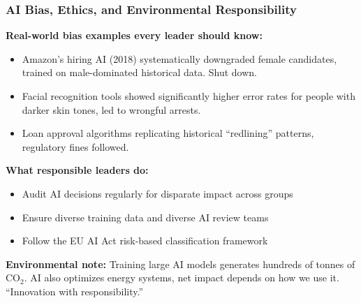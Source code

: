 \begin{frame}[fragile]\frametitle{AI Bias, Ethics, and Environmental Responsibility}

\textbf{Real-world bias examples every leader should know:}
\begin{itemize}
  \item Amazon's hiring AI (2018) systematically downgraded female candidates, trained on male-dominated historical data. Shut down.
  \item Facial recognition tools showed significantly higher error rates for people with darker skin tones, led to wrongful arrests.
  \item Loan approval algorithms replicating historical ``redlining'' patterns, regulatory fines followed.
\end{itemize}

\textbf{What responsible leaders do:}
\begin{itemize}
  \item Audit AI decisions regularly for disparate impact across groups
  \item Ensure diverse training data and diverse AI review teams
  \item Follow the EU AI Act risk-based classification framework
\end{itemize}

\textbf{Environmental note:} Training large AI models generates hundreds of tonnes of CO$_2$. AI also optimizes energy systems, net impact depends on how we use it. ``Innovation with responsibility.''

\end{frame}


